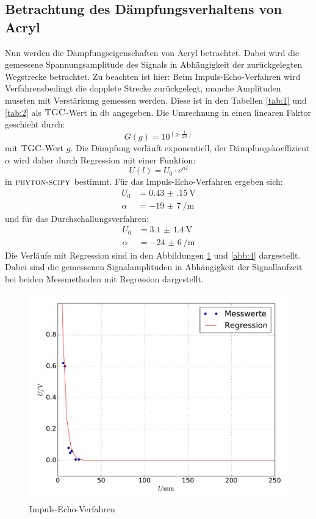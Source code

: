 \documentclass[
  bibliography=totoc,     %
  captions=tableheading,  %
  titlepage=firstiscover, %
]{scrartcl}
\begin{document}
\subsection{Betrachtung des Dämpfungsverhaltens von Acryl}
Nun werden die Dämpfungseigenschaften von Acryl betrachtet. Dabei wird die gemessene
Spannungsamplitude des Signals in Abhängigkeit der zurückgelegten Wegstrecke betrachtet.
Zu beachten ist hier: Beim Impuls-Echo-Verfahren wird Verfahrensbedingt die dopplete Strecke zurückgelegt,
manche Amplituden mussten mit Verstärkung gemessen werden. Diese ist in den Tabellen
\ref{tab:1} und \ref{tab:2} als $\textsc{TGC}$-Wert in \si{\decibel} angegeben. Die Umrechnung in einen
linearen Faktor geschieht durch:
  \begin{equation}
    G(g) = 10^{ \left( g \cdot \frac{1}{20} \right)}
    \label{eqqA:1}
  \end{equation}
  mit $\textsc{TGC}$-Wert $g$.
Die Dämpfung verläuft exponentiell, der Dämpfungskoeffizient $\alpha$ wird daher durch Regression
mit einer Funktion:
\begin{equation}
  U(l) = U_0 \cdot e^{\alpha l}
\end{equation}
in $\textsc{phyton-scipy}$ bestimmt. Für das Impuls-Echo-Verfahren ergeben sich:
\begin{align*}
  U_0 &= \SI{0.43(15)}{\volt}\\
  \alpha &= \SI{-19(7)}{\per\metre}
\end{align*}
und für das Durchschallungsverfahren:
\begin{align*}
  U_0 &= \SI{3.1(14)}{\volt}\\
  \alpha &= \SI{-24(6)}{\per\metre}
\end{align*}
Die Verläufe mit Regression sind in den Abbildungen \ref{abb:3} und \ref{abb:4} dargestellt. Dabei sind die gemessenen Signalamplituden in Abhängigkeit
der Signallaufzeit bei beiden Messmethoden mit Regression dargestellt.
\begin{figure}
    \centering
    \includegraphics[width=\textwidth]{ImpDump.pdf}
    \caption{Impuls-Echo-Verfahren}
    \label{abb:3}
  \end{figure}
\end{document}
